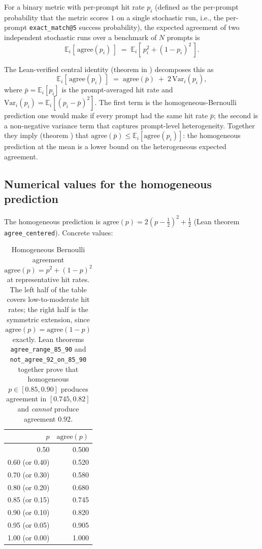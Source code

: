 \documentclass[11pt]{article}
\begin{document}
For a binary metric with per-prompt hit rate $p_i$ (defined as the
  per-prompt probability that the metric scores $1$ on a single
  stochastic run, i.e., the per-prompt \texttt{exact\_match@5}
  success probability), the expected agreement of two independent
  stochastic runs over a benchmark of $N$ prompts is
\[
  \mathbb{E}_i[\,\text{agree}(p_i)\,]
  \;=\;
  \mathbb{E}_i[\,p_i^2 + (1-p_i)^2\,].
\]

The Lean-verified central identity (theorem
  in ) decomposes this as
\[
  \mathbb{E}_i[\,\text{agree}(p_i)\,]
  \;=\;
  \text{agree}(\bar p)
  \;+\; 2\,\mathrm{Var}_i(p_i),
\]
where $\bar p = \mathbb{E}_i[p_i]$ is the prompt-averaged hit rate
  and $\mathrm{Var}_i(p_i) = \mathbb{E}_i[(p_i - \bar p)^2]$.
The first term is the homogeneous-Bernoulli prediction one would
  make if every prompt had the same hit rate $\bar p$; the second is
  a non-negative variance term that captures prompt-level
  heterogeneity.
Together they imply (theorem
  ) that
  $\text{agree}(\bar p) \le \mathbb{E}_i[\text{agree}(p_i)]$: the
  homogeneous prediction at the mean is a lower bound on the
  heterogeneous expected agreement.

\subsection{Numerical values for the homogeneous prediction}
\label{sec:tr-case-c-numerics}

The homogeneous prediction is
$\text{agree}(p) = 2(p - \tfrac{1}{2})^2 + \tfrac{1}{2}$
  (Lean theorem \texttt{agree\_centered}).
Concrete values:

\begin{table}[htbp]
\centering
\small
\caption{Homogeneous Bernoulli agreement
  $\text{agree}(p) = p^2 + (1-p)^2$ at representative hit rates.
The left half of the table covers low-to-moderate hit rates; the
  right half is the symmetric extension, since $\text{agree}(p)
  = \text{agree}(1-p)$ exactly.
Lean theorems \texttt{agree\_range\_85\_90} and
  \texttt{not\_agree\_92\_on\_85\_90} together prove that
  homogeneous $p \in [0.85, 0.90]$ produces agreement in
  $[0.745, 0.82]$ and \emph{cannot} produce agreement $0.92$.}
\label{tab:tr-agree-values}
\begin{tabular}{rr}
\toprule
$p$ & $\text{agree}(p)$ \\
\midrule
0.50 & 0.500 \\
0.60 (or 0.40) & 0.520 \\
0.70 (or 0.30) & 0.580 \\
0.80 (or 0.20) & 0.680 \\
0.85 (or 0.15) & 0.745 \\
0.90 (or 0.10) & 0.820 \\
0.95 (or 0.05) & 0.905 \\
1.00 (or 0.00) & 1.000 \\
\bottomrule
\end{tabular}
\end{table}
\end{document}
